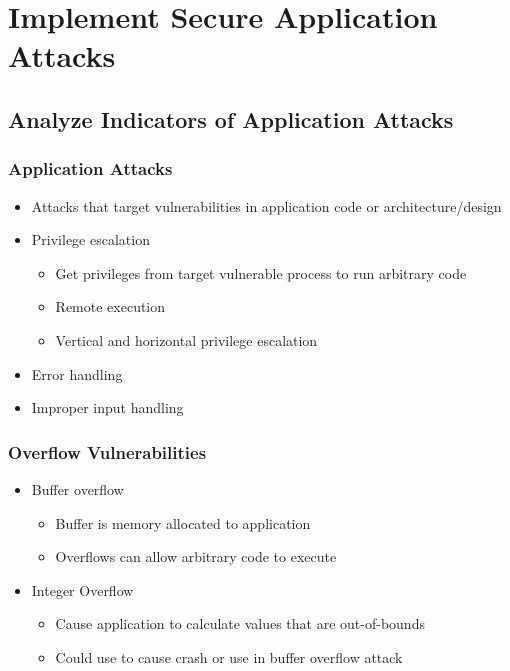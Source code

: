 \section {Implement Secure Application Attacks}
	\subsection {Analyze Indicators of Application Attacks}
		\subsubsection {Application Attacks}
			\begin{itemize}
				\item Attacks that target vulnerabilities in application code or
					architecture/design
				\item Privilege escalation
					\begin{itemize}
						\item Get privileges from target vulnerable process to
							run arbitrary code
						\item Remote execution
						\item Vertical and horizontal privilege escalation
					\end{itemize}
				\item Error handling
				\item Improper input handling
			\end{itemize}
		\subsubsection {Overflow Vulnerabilities}
			\begin{itemize}
				\item Buffer overflow
					\begin{itemize}
						\item Buffer is memory allocated to application
						\item Overflows can allow arbitrary code to execute
					\end{itemize}
				\item Integer Overflow
					\begin{itemize}
						\item Cause application to calculate values that are
							out-of-bounds
						\item Could use to cause crash or use in buffer overflow attack
					\end{itemize}
			\end{itemize}
